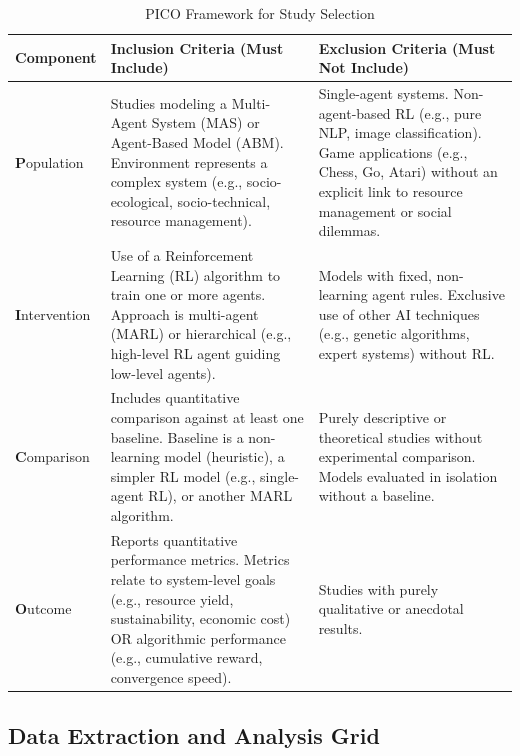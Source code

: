 \documentclass[conference]{IEEEtran}
\begin{document}
\begin{table}[htbp]
\caption{PICO Framework for Study Selection}
\begin{center}
\begin{tabular}{|l|p{7.5cm}|p{7.5cm}|}
\hline
\textbf{Component} & \textbf{Inclusion Criteria (Must Include)} & \textbf{Exclusion Criteria (Must Not Include)} \\
\hline
\textbf{P}opulation & 
Studies modeling a Multi-Agent System (MAS) or Agent-Based Model (ABM). \newline
Environment represents a complex system (e.g., socio-ecological, socio-technical, resource management).
& 
Single-agent systems. \newline
Non-agent-based RL (e.g., pure NLP, image classification). \newline
Game applications (e.g., Chess, Go, Atari) without an explicit link to resource management or social dilemmas.
\\
\hline
\textbf{I}ntervention & 
Use of a Reinforcement Learning (RL) algorithm to train one or more agents. \newline
Approach is multi-agent (MARL) or hierarchical (e.g., high-level RL agent guiding low-level agents).
& 
Models with fixed, non-learning agent rules. \newline
Exclusive use of other AI techniques (e.g., genetic algorithms, expert systems) without RL.
\\
\hline
\textbf{C}omparison & 
Includes quantitative comparison against at least one baseline. \newline
Baseline is a non-learning model (heuristic), a simpler RL model (e.g., single-agent RL), or another MARL algorithm.
& 
Purely descriptive or theoretical studies without experimental comparison. \newline
Models evaluated in isolation without a baseline.
\\
\hline
\textbf{O}utcome & 
Reports quantitative performance metrics. \newline
Metrics relate to system-level goals (e.g., resource yield, sustainability, economic cost) OR algorithmic performance (e.g., cumulative reward, convergence speed).
& 
Studies with purely qualitative or anecdotal results.
\\
\hline
\end{tabular}
\label{tab:pico}
\end{center}
\end{table}

\subsection{Data Extraction and Analysis Grid}
\end{document}
